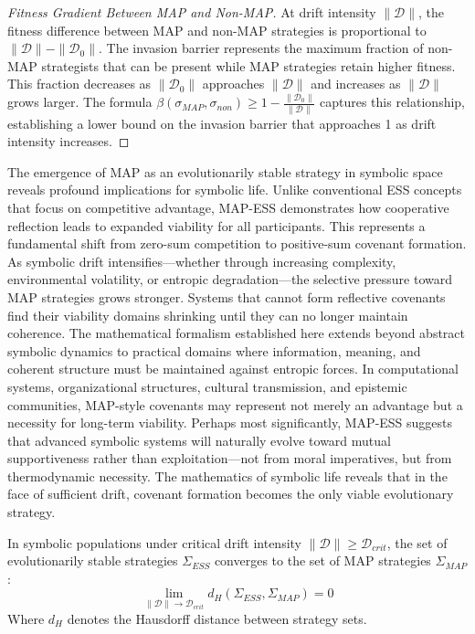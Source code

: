 \begin{proof}[Fitness Gradient Between MAP and Non-MAP]
\label{proof:bk5_map_vs_nonmap_gradient}
At drift intensity $\|\mathcal{D}\|$, the fitness difference between MAP and non-MAP strategies is proportional to $\|\mathcal{D}\| - \|\mathcal{D}_0\|$.
The invasion barrier represents the maximum fraction of non-MAP strategists that can be present while MAP strategies retain higher fitness. This fraction decreases as $\|\mathcal{D}_0\|$ approaches $\|\mathcal{D}\|$ and increases as $\|\mathcal{D}\|$ grows larger.
The formula $\beta(\sigma_{MAP}, \sigma_{non}) \geq 1 - \frac{\|\mathcal{D}_0\|}{\|\mathcal{D}\|}$ captures this relationship, establishing a lower bound on the invasion barrier that approaches 1 as drift intensity increases.
\end{proof}
\begin{scholium}
\label{scholium:bk5__map_ess_implications}
The emergence of MAP as an evolutionarily stable strategy in symbolic space reveals profound implications for symbolic life. Unlike conventional ESS concepts that focus on competitive advantage, MAP-ESS demonstrates how cooperative reflection leads to expanded viability for all participants. This represents a fundamental shift from zero-sum competition to positive-sum covenant formation.
As symbolic drift intensifies—whether through increasing complexity, environmental volatility, or entropic degradation—the selective pressure toward MAP strategies grows stronger. Systems that cannot form reflective covenants find their viability domains shrinking until they can no longer maintain coherence.
The mathematical formalism established here extends beyond abstract symbolic dynamics to practical domains where information, meaning, and coherent structure must be maintained against entropic forces. In computational systems, organizational structures, cultural transmission, and epistemic communities, MAP-style covenants may represent not merely an advantage but a necessity for long-term viability.
Perhaps most significantly, MAP-ESS suggests that advanced symbolic systems will naturally evolve toward mutual supportiveness rather than exploitation—not from moral imperatives, but from thermodynamic necessity. The mathematics of symbolic life reveals that in the face of sufficient drift, covenant formation becomes the only viable evolutionary strategy.
\end{scholium}
\begin{proposition}
\label{prop:bk5_symbolic_population_ess_map_equivalence_case2}
In symbolic populations under critical drift intensity $\|\mathcal{D}\| \geq \mathcal{D}_{crit}$, the set of evolutionarily stable strategies $\Sigma_{ESS}$ converges to the set of MAP strategies $\Sigma_{MAP}$:
\begin{equation}
\lim_{\|\mathcal{D}\| \to \mathcal{D}_{crit}} d_H(\Sigma_{ESS}, \Sigma_{MAP}) = 0
\end{equation}
Where $d_H$ denotes the Hausdorff distance between strategy sets.
\end{proposition}
